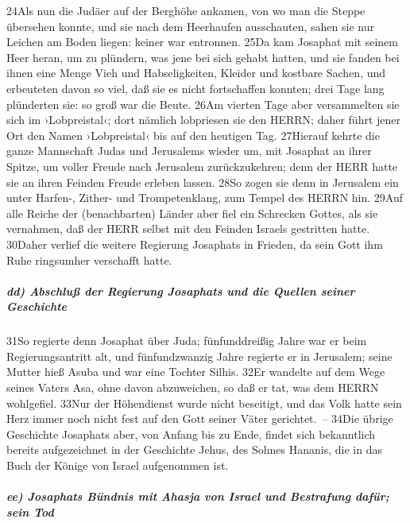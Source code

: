 24Als nun die Judäer auf der Berghöhe ankamen, von wo man die Steppe
übersehen konnte, und sie nach dem Heerhaufen ausschauten, sahen sie nur
Leichen am Boden liegen: keiner war entronnen. 25Da kam Josaphat mit
seinem Heer heran, um zu plündern, was jene bei sich gehabt hatten, und
sie fanden bei ihnen eine Menge Vieh und Habseligkeiten, Kleider und
kostbare Sachen, und erbeuteten davon so viel, daß sie es nicht
fortschaffen konnten; drei Tage lang plünderten sie: so groß war die
Beute. 26Am vierten Tage aber versammelten sie sich im ›Lobpreistal‹;
dort nämlich lobpriesen sie den HERRN; daher führt jener Ort den Namen
›Lobpreistal‹ bis auf den heutigen Tag. 27Hierauf kehrte die ganze
Mannschaft Judas und Jerusalems wieder um, mit Josaphat an ihrer Spitze,
um voller Freude nach Jerusalem zurückzukehren; denn der HERR hatte sie
an ihren Feinden Freude erleben lassen. 28So zogen sie denn in Jerusalem
ein unter Harfen-, Zither- und Trompetenklang, zum Tempel des HERRN hin.
29Auf alle Reiche der (benachbarten) Länder aber fiel ein Schrecken
Gottes, als sie vernahmen, daß der HERR selbst mit den Feinden Israels
gestritten hatte. 30Daher verlief die weitere Regierung Josaphats in
Frieden, da sein Gott ihm Ruhe ringsumher verschafft hatte.

\hypertarget{dd-abschluuxdf-der-regierung-josaphats-und-die-quellen-seiner-geschichte}{%
\subparagraph{dd) Abschluß der Regierung Josaphats und die Quellen
seiner
Geschichte}\label{dd-abschluuxdf-der-regierung-josaphats-und-die-quellen-seiner-geschichte}}

31So regierte denn Josaphat über Juda; fünfunddreißig Jahre war er beim
Regierungsantritt alt, und fünfundzwanzig Jahre regierte er in
Jerusalem; seine Mutter hieß Asuba und war eine Tochter Silhis. 32Er
wandelte auf dem Wege seines Vaters Asa, ohne davon abzuweichen, so daß
er tat, was dem HERRN wohlgefiel. 33Nur der Höhendienst wurde nicht
beseitigt, und das Volk hatte sein Herz immer noch nicht fest auf den
Gott seiner Väter gerichtet.~-- 34Die übrige Geschichte Josaphats aber,
von Anfang bis zu Ende, findet sich bekanntlich bereits aufgezeichnet in
der Geschichte Jehus, des Sohnes Hananis, die in das Buch der Könige von
Israel aufgenommen ist.

\hypertarget{ee-josaphats-buxfcndnis-mit-ahasja-von-israel-und-bestrafung-dafuxfcr-sein-tod}{%
\subparagraph{ee) Josaphats Bündnis mit Ahasja von Israel und Bestrafung
dafür; sein
Tod}\label{ee-josaphats-buxfcndnis-mit-ahasja-von-israel-und-bestrafung-dafuxfcr-sein-tod}}

